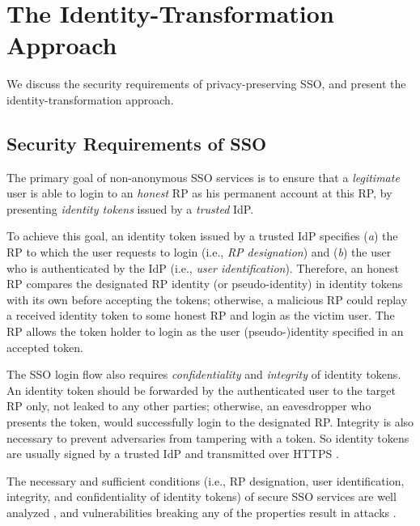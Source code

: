 \section{The Identity-Transformation Approach}
\label{sec:challenge}

We discuss the security requirements of privacy-preserving SSO,
 and present the identity-transformation approach.


\subsection{Security Requirements of SSO}
\label{subsec:basicrequirements}

The primary goal of non-anonymous SSO services \cite{OpenIDConnect,rfc6749,SAML,SAMLIdentifier,NIST2017draft} is %
 to ensure that a \emph{legitimate} user is able to login to an \emph{honest} RP as his permanent account at this RP, %
    by presenting \emph{identity tokens} issued by a \emph{trusted} IdP.

To achieve this goal,
 an identity token issued by a trusted IdP \cite{OpenIDConnect,rfc6749,SAML,SAMLIdentifier,NIST2017draft} specifies (\emph{a}) the RP to which the user requests to login (i.e., \emph{RP designation})
    and  (\emph{b}) the user who is authenticated by the IdP (i.e., \emph{user identification}).
Therefore,
    an honest RP compares the designated RP identity (or pseudo-identity) in identity tokens with its own before accepting the tokens;
     otherwise,
        a malicious RP could replay a received identity token to some honest RP and login as the victim user.
The RP allows the token holder to login as the user (pseudo-)identity specified in an accepted token.

The SSO login flow also requires \emph{confidentiality} and \emph{integrity} of identity tokens.
An identity token should be forwarded by the authenticated user to the target RP only,
    not leaked to any other parties;
        otherwise, an eavesdropper who presents the token, would successfully login to the designated RP.
Integrity is also necessary
    to prevent adversaries from tampering with a token.
So identity tokens are usually signed by a trusted IdP and transmitted over HTTPS \cite{OpenIDConnect,rfc6749,SAML}.


The necessary and  sufficient conditions
     (i.e., RP designation, user identification, integrity, and confidentiality of identity tokens) 
    of secure SSO services
     are well analyzed \cite{ArmandoCCCT08,FettKS16, FettKS17},
     and
     vulnerabilities breaking any of the properties
            result in attacks \cite{SomorovskyMSKJ12, WangCW12, ArmandoCCCPS13, ZhouE14, WangZLLYLG15, WangZLG16, YangLLZH16, MainkaMS16, MainkaMSW17, YangLCZ18, YangLS17, ShiWL19, ChenPCTKT14, ccsSunB12, DiscoveringJCS, dimvaLiM16, CaoSBKVC14, TowardsShehabM14}.


